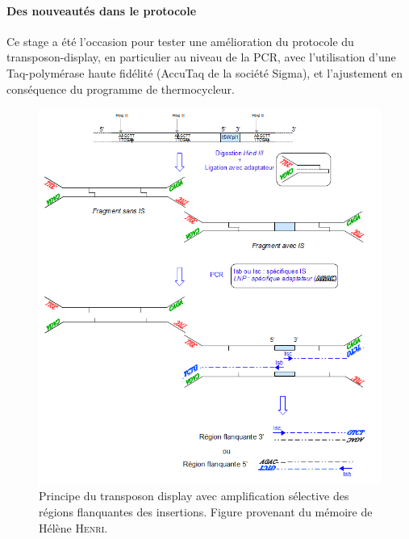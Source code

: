 	\paragraph{Des nouveautés dans le protocole} %
	\label{par:protocole2}
	Ce stage a été l'occasion pour tester une amélioration du protocole du transposon-display, en particulier au niveau de la PCR, avec l'utilisation d'une Taq-polymérase haute fidélité (AccuTaq de la société Sigma), et l'ajustement en conséquence du programme de thermocycleur.

\begin{figure}[h!]
	\begin{center}
		\includegraphics[width=160mm]{tdisplay.png}
	\end{center}
	\caption{Principe du transposon display avec amplification sélective des régions
flanquantes des insertions. Figure provenant du mémoire de Hélène \textsc{Henri}\cite{memHH}.%
	}
	\label{fig:figure1}
\end{figure}

